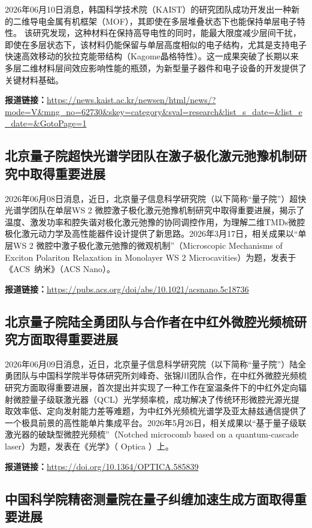 \documentclass[12pt,a4paper]{ctexart}
\begin{document}
2026年06月10日消息，韩国科学技术院（KAIST）的研究团队成功开发出一种新的二维导电金属有机框架（MOF），其即使在多层堆叠状态下也能保持单层电子特性。 该研究发现，这种材料在保持高导电性的同时，能最大限度减少层间干扰，即使在多层状态下，该材料仍能保留与单层高度相似的电子结构，尤其是支持电子快速高效移动的狄拉克能带结构（Kagome晶格特性）。这一成果突破了长期以来多层二维材料层间效应影响性能的瓶颈，为新型量子器件和电子设备的开发提供了关键材料基础。

\noindent\textbf{报道链接：}\url{https://news.kaist.ac.kr/newsen/html/news/?mode=V\&mng\_no=62730\&skey=category\&sval=research\&list\_s\_date=\&list\_e\_date=\&GotoPage=1}

\subsection{ 北京量子院超快光谱学团队在激子极化激元弛豫机制研究中取得重要进展 }

2026年06月08日消息，近日，北京量子信息科学研究院（以下简称“量子院”）超快光谱学团队在单层WS
2
微腔激子极化激元弛豫机制研究中取得重要进展，揭示了温度、激发功率和腔失谐对极化激元弛豫的协同调控作用，为理解二维TMDs微腔极化激元动力学及高性能器件设计提供了新思路。2026年3月17日，相关成果以“单层WS 2 微腔中激子极化激元弛豫的微观机制”（Microscopic Mechanisms of Exciton Polariton Relaxation in Monolayer WS 2 Microcavities）为题，发表于《ACS 纳米》（ACS Nano）。

\noindent\textbf{报道链接：}\url{https://pubs.acs.org/doi/abs/10.1021/acsnano.5c18736}

\subsection{ 北京量子院陆全勇团队与合作者在中红外微腔光频梳研究方面取得重要进展 }

2026年06月09日消息，近日，北京量子信息科学研究院（以下简称“量子院”）陆全勇团队与中国科学院半导体研究所刘峰奇、张锦川团队合作，在中红外微腔光频梳研究方面取得重要进展，首次提出并实现了一种工作在室温条件下的中红外定向辐射微腔量子级联激光器（QCL）光学频率梳，成功解决了传统环形微腔光源光提取效率低、定向发射能力差等难题，为中红外光频梳光谱学及亚太赫兹通信提供了一个极具前景的高性能单片集成平台。2026年5月26日，相关成果以“基于量子级联激光器的破缺型微腔光频梳”（Notched microcomb based on a quantum-cascade laser）为题，发表在《光学》（
Optica
）上。


\noindent\textbf{报道链接：}\url{https://doi.org/10.1364/OPTICA.585839}

\subsection{ 中国科学院精密测量院在量子纠缠加速生成方面取得重要进展 }
\end{document}
